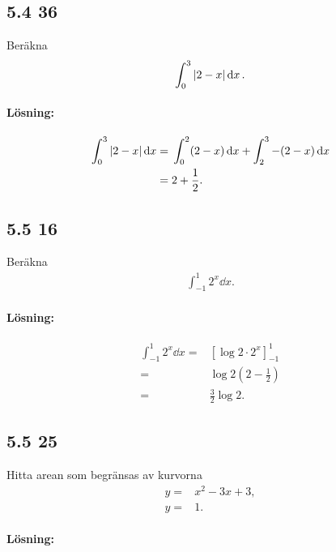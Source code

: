 \subsection{5.4 36}%
\label{sub:5_4_36}

Beräkna
\begin{align*}
	\int_0^3 \abs{2 - x} \dd{x}.
\end{align*}

\paragraph{Lösning:}

\begin{align*}
	\int_0^3 \abs{2 - x} \dd{x} ={}& \int_0^2 (2 - x) \dd{x} + \int_2^3 -(2 - x) \dd{x}\\
	={}& 2 + \frac{1}{2}.
\end{align*}


\subsection{5.5 16}%
\label{sub:5_5_16}

Beräkna
\begin{align*}
	\int_{-1}^1 2^x \dd{x}.
\end{align*}

\paragraph{Lösning:}

\begin{align*}
	\int_{-1}^1 2^x \dd{x} ={}& \left[\log{2} \cdot 2^x\right]_{-1}^1\\
	={}& \log{2}(2 - \frac{1}{2})\\
	={}& \frac{3}{2} \log{2}.
\end{align*}


\subsection{5.5 25}%
\label{sub:5_5_25}

Hitta arean som begränsas av kurvorna
\begin{align*}
	y ={}& x^2 - 3 x + 3,\\
	y ={}& 1.
\end{align*}

\paragraph{Lösning:}

